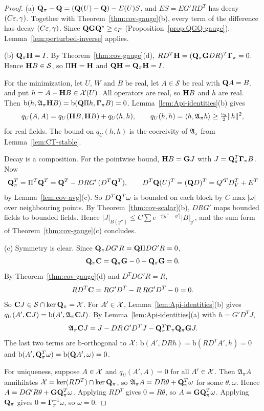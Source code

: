 \begin{proof}
(a) $\mathbf Q_\pi-\mathbf Q=(\mathbf Q(U)-\mathbf Q)-E(U)S$, and $ES=EG'RD^T$ has decay $(C\varepsilon,\gamma)$. Together with Theorem~\ref{thm:cov-gauge}(b), every term of the difference has decay $(C\varepsilon,\gamma)$. Since $\mathbf Q\mathbf G\mathbf Q^*\ge c_F$ (Proposition~\ref{prop:QGQ-gauge}), Lemma~\ref{lem:perturbed-inverse} applies.

(b) $\mathbf Q_\pi\mathbf H=I$. By Theorem~\ref{thm:cov-gauge}(d), $RD^T\mathbf H=(\mathbf Q_\pi\mathbf G DR)^T\boldsymbol\Gamma_\pi=0$. Hence $\mathbf H B\in\mathcal S$, so $\Pi\mathbf H=\mathbf H$ and $\mathbf Q\mathbf H=\mathbf Q_\pi\mathbf H=I$.

For the minimization, let $U$, $W$ and $B$ be real, let $A\in\mathcal S$ be real with $\mathbf Q A=B$, and put $h=A-\mathbf H B\in\mathcal X(U)$. All operators are real, so $\mathbf H B$ and $h$ are real. Then $\mathrm b(h,\mathfrak A_\pi\mathbf H B)=\mathrm b(\mathbf Q\Pi h,\boldsymbol\Gamma_\pi B)=0$. Lemma~\ref{lem:Api-identities}(b) gives
\[
q_U(A,A)=q_U(\mathbf H B,\mathbf H B)+q_U(h,h),\qquad q_U(h,h)=\langle h,\mathfrak A_\pi h\rangle\ge\tfrac{c_g}2\|h\|^2 ,
\]
for real fields. The bound on $q_U(h,h)$ is the coercivity of $\mathfrak A_\pi$ from Lemma~\ref{lem:CT-stable}.

Decay is a composition. For the pointwise bound, $\mathbf H B=\mathbf G J$ with $J=\mathbf Q_\pi^T\boldsymbol\Gamma_\pi B$. Now
\[
\mathbf Q_\pi^T=\Pi^T\mathbf Q^T=\mathbf Q^T-DRG'\,(D^T\mathbf Q^T),\qquad D^T\mathbf Q(U)^T=(\mathbf Q D)^T=Q'^TD_V^T+E^T
\]
by Lemma~\ref{lem:cov-avg}(c). So $D^T\mathbf Q^T\omega$ is bounded on each block by $C\max|\omega|$ over neighbouring points. By Theorem~\ref{thm:cov-scalar}(b), $DRG'$ maps bounded fields to bounded fields. Hence $|J|_{B(y'')}\le C\sum e^{-\gamma|y''-y'|}|B|_{y'}$, and the sum form of Theorem~\ref{thm:cov-gauge}(c) concludes.

(c) Symmetry is clear. Since $\mathbf Q_\pi DG'R=\mathbf Q\Pi DG'R=0$,
\[
\mathbf Q_\pi\mathbf C=\mathbf Q_\pi\mathbf G-0-\mathbf Q_\pi\mathbf G=0 .
\]
By Theorem~\ref{thm:cov-gauge}(d) and $D^TDG'R=R$,
\[
RD^T\mathbf C=RG'D^T-R\,RG'D^T-0=0 .
\]
So $\mathbf C J\in\mathcal S\cap\ker\mathbf Q_\pi=\mathcal X$. For $A'\in\mathcal X$, Lemma~\ref{lem:Api-identities}(b) gives $q_U(A',\mathbf C J)=\mathrm b(A',\mathfrak A_\pi\mathbf C J)$. By Lemma~\ref{lem:Api-identities}(a) with $h=G'D^TJ$,
\[
\mathfrak A_\pi\mathbf C J=J-DR\,G'D^TJ-\mathbf Q_\pi^T\boldsymbol\Gamma_\pi\mathbf Q_\pi\mathbf G J .
\]
The last two terms are $\mathrm b$-orthogonal to $\mathcal X$: $\mathrm b(A',DRh)=\mathrm b(RD^TA',h)=0$ and $\mathrm b(A',\mathbf Q_\pi^T\omega)=\mathrm b(\mathbf Q A',\omega)=0$.

For uniqueness, suppose $A\in\mathcal X$ and $q_U(A',A)=0$ for all $A'\in\mathcal X$. Then $\mathfrak A_\pi A$ annihilates $\mathcal X=\ker(RD^T)\cap\ker\mathbf Q_\pi$, so $\mathfrak A_\pi A=DR\theta+\mathbf Q_\pi^T\omega$ for some $\theta,\omega$. Hence $A=DG'R\theta+\mathbf G\mathbf Q_\pi^T\omega$. Applying $RD^T$ gives $0=R\theta$, so $A=\mathbf G\mathbf Q_\pi^T\omega$. Applying $\mathbf Q_\pi$ gives $0=\boldsymbol\Gamma_\pi^{-1}\omega$, so $\omega=0$.


\end{proof}
